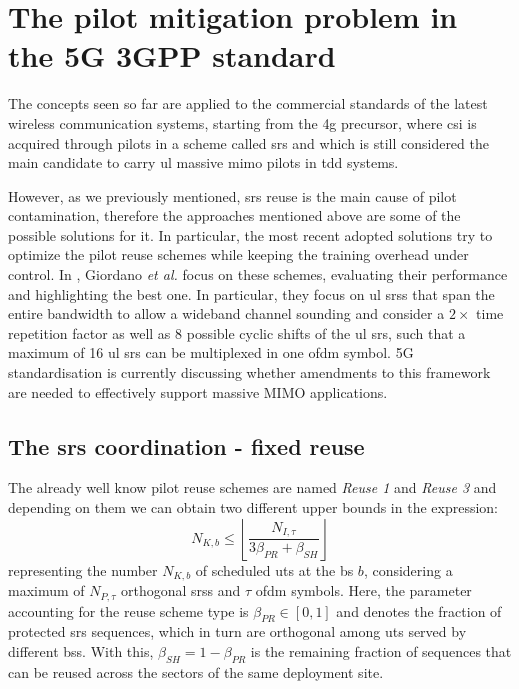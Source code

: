 \documentclass[11pt]{book}
\begin{document}
\section{The pilot mitigation problem in the 5G 3GPP standard}
The concepts seen so far are applied to the commercial standards of the latest wireless communication systems, starting from the \gls{4g} precursor, where \gls{csi} is acquired through pilots in a scheme called \gls{srs} and which is still considered the main candidate to carry \gls{ul} massive \gls{mimo} pilots in \gls{tdd} systems.

However, as we previously mentioned, \gls{srs} reuse is the main cause of pilot contamination, therefore the approaches mentioned above are some of the possible solutions for it. In particular, the most recent adopted solutions try to optimize the pilot reuse schemes while keeping the training overhead under control. In \cite{Giordano}, Giordano \textit{et al.} focus on these schemes, evaluating their performance and highlighting the best one. In particular, they focus on \gls{ul} \gls{srs}s that span the entire bandwidth to allow a wideband channel sounding and consider a $2\times$ time repetition factor as well as 8 possible cyclic shifts of the \gls{ul} \gls{srs}, such that a maximum of 16 \gls{ul} \gls{srs} can be multiplexed in one \gls{ofdm} symbol. 5G standardisation is currently discussing whether amendments to this framework are needed to effectively support massive MIMO applications.

\subsection{The \gls{srs} coordination - fixed reuse}
The already well know pilot reuse schemes are named \textit{Reuse 1} and \textit{Reuse 3} and depending on them we can obtain two different upper bounds in the expression:
\begin{equation}
  N_{K,b} \leq \left\lfloor \frac{N_{I,\tau}}{3\beta_{PR}+\beta_{SH}} \right\rfloor
\end{equation}
representing the number $N_{K,b}$ of scheduled \gls{ut}s at the \gls{bs} $b$, considering a maximum of $N_{P,\tau}$ orthogonal \gls{srs}s and $\tau$ \gls{ofdm} symbols. Here, the parameter accounting for the reuse scheme type is $\beta_{PR} \in [0,1]$ and denotes the fraction of protected \gls{srs} sequences, which in turn are orthogonal among \gls{ut}s served by different \gls{bs}s. With this, $\beta_{SH} = 1 - \beta_{PR}$ is the remaining fraction of sequences that can be reused across the sectors of the same deployment site.
\end{document}
